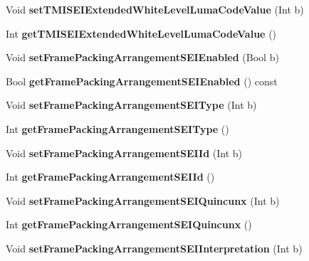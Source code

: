 \begin{DoxyCompactItemize}
Void {\bfseries set\+T\+M\+I\+S\+E\+I\+Extended\+White\+Level\+Luma\+Code\+Value} (Int b)
\item 
\mbox{\label{class_t_enc_cfg_a52171d1915f9ef1fadac0f30928fa169}} 
Int {\bfseries get\+T\+M\+I\+S\+E\+I\+Extended\+White\+Level\+Luma\+Code\+Value} ()
\item 
\mbox{\label{class_t_enc_cfg_af871408095baf9abbc2e04bf068d8f92}} 
Void {\bfseries set\+Frame\+Packing\+Arrangement\+S\+E\+I\+Enabled} (Bool b)
\item 
\mbox{\label{class_t_enc_cfg_abd3fdaf4823509e4b2cfb9b7aaa11005}} 
Bool {\bfseries get\+Frame\+Packing\+Arrangement\+S\+E\+I\+Enabled} () const
\item 
\mbox{\label{class_t_enc_cfg_a62deaac088d2b30942980c5541ec3730}} 
Void {\bfseries set\+Frame\+Packing\+Arrangement\+S\+E\+I\+Type} (Int b)
\item 
\mbox{\label{class_t_enc_cfg_a9512440795715792806a8514119b8ddf}} 
Int {\bfseries get\+Frame\+Packing\+Arrangement\+S\+E\+I\+Type} ()
\item 
\mbox{\label{class_t_enc_cfg_af6b77c0a451b51673e8204eeb6be9bd2}} 
Void {\bfseries set\+Frame\+Packing\+Arrangement\+S\+E\+I\+Id} (Int b)
\item 
\mbox{\label{class_t_enc_cfg_a3b71604634f52f03c3e7bb40dcad89ca}} 
Int {\bfseries get\+Frame\+Packing\+Arrangement\+S\+E\+I\+Id} ()
\item 
\mbox{\label{class_t_enc_cfg_af8dac8f59745ba46a4b914353ecd6c4f}} 
Void {\bfseries set\+Frame\+Packing\+Arrangement\+S\+E\+I\+Quincunx} (Int b)
\item 
\mbox{\label{class_t_enc_cfg_ab95112fcd92a37bb2dc5006c46cc39ce}} 
Int {\bfseries get\+Frame\+Packing\+Arrangement\+S\+E\+I\+Quincunx} ()
\item 
\mbox{\label{class_t_enc_cfg_a4d3bb76f123255c9cba983289f208e9a}} 
Void {\bfseries set\+Frame\+Packing\+Arrangement\+S\+E\+I\+Interpretation} (Int b)
\item 

\end{DoxyCompactItemize}
